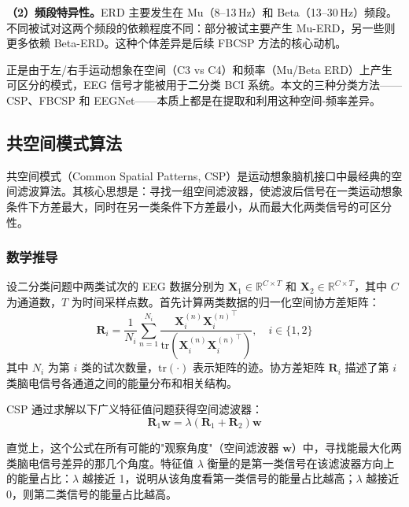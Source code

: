 \textbf{（2）频段特异性。}ERD 主要发生在 Mu（8--13\,Hz）和 Beta（13--30\,Hz）频段。不同被试对这两个频段的依赖程度不同：部分被试主要产生 Mu-ERD，另一些则更多依赖 Beta-ERD。这种个体差异是后续 FBCSP 方法的核心动机。

正是由于左/右手运动想象在空间（C3 vs C4）和频率（Mu/Beta ERD）上产生可区分的模式，EEG 信号才能被用于二分类 BCI 系统。本文的三种分类方法——CSP、FBCSP 和 EEGNet——本质上都是在提取和利用这种空间-频率差异。

\subsection{共空间模式算法}
\label{sec:csp-theory}

共空间模式（Common Spatial Patterns, CSP）是运动想象脑机接口中最经典的空间滤波算法。其核心思想是：寻找一组空间滤波器，使滤波后信号在一类运动想象条件下方差最大，同时在另一类条件下方差最小，从而最大化两类信号的可区分性。

\subsubsection{数学推导}

设二分类问题中两类试次的 EEG 数据分别为 $\mathbf{X}_1 \in \mathbb{R}^{C \times T}$ 和 $\mathbf{X}_2 \in \mathbb{R}^{C \times T}$，其中 $C$ 为通道数，$T$ 为时间采样点数。首先计算两类数据的归一化空间协方差矩阵：
\begin{equation}\label{eq:cov}
\mathbf{R}_i = \frac{1}{N_i} \sum_{n=1}^{N_i} \frac{\mathbf{X}_i^{(n)} {\mathbf{X}_i^{(n)}}^\top}{\mathrm{tr}(\mathbf{X}_i^{(n)} {\mathbf{X}_i^{(n)}}^\top)}, \quad i \in \{1, 2\}
\end{equation}
其中 $N_i$ 为第 $i$ 类的试次数量，$\mathrm{tr}(\cdot)$ 表示矩阵的迹。协方差矩阵 $\mathbf{R}_i$ 描述了第 $i$ 类脑电信号各通道之间的能量分布和相关结构。

CSP 通过求解以下广义特征值问题获得空间滤波器：
\begin{equation}\label{eq:csp-eigen}
\mathbf{R}_1 \mathbf{w} = \lambda (\mathbf{R}_1 + \mathbf{R}_2) \mathbf{w}
\end{equation}

直觉上，这个公式在所有可能的"观察角度"（空间滤波器 $\mathbf{w}$）中，寻找能最大化两类脑电信号差异的那几个角度。特征值 $\lambda$ 衡量的是第一类信号在该滤波器方向上的能量占比：$\lambda$ 越接近 1，说明从该角度看第一类信号的能量占比越高；$\lambda$ 越接近 0，则第二类信号的能量占比越高。

